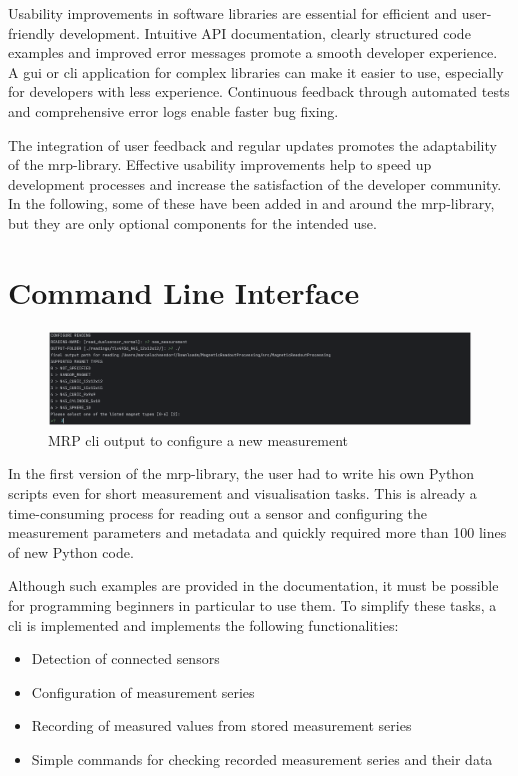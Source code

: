 Usability improvements in software libraries are essential for efficient
and user-friendly development. Intuitive API documentation, clearly
structured code examples and improved error messages promote a smooth
developer experience. A \gls{gui} or \gls{cli} application for complex
libraries can make it easier to use, especially for developers with less
experience. Continuous feedback through automated tests and
comprehensive error logs enable faster bug fixing.

The integration of user feedback and regular updates promotes the
adaptability of the \gls{mrp}-library. Effective usability improvements
help to speed up development processes and increase the satisfaction of
the developer community. In the following, some of these have been added
in and around the \gls{mrp}-library, but they are only optional
components for the intended use.

\hypertarget{command-line-interface}{%
\section{Command Line Interface}\label{command-line-interface}}

\begin{figure}
\centering
\includegraphics{./generated_images/border_MRP_(+cli)_output_to_configure_a_new_measurement.png}
\caption{MRP \gls{cli} output to configure a new measurement
\label{MRP_(+cli)_output_to_configure_a_new_measurement.png}}
\end{figure}

In the first version of the \gls{mrp}-library, the user had to write his
own Python scripts even for short measurement and visualisation tasks.
This is already a time-consuming process for reading out a sensor and
configuring the measurement parameters and metadata and quickly required
more than 100 lines of new Python code.

Although such examples are provided in the documentation, it must be
possible for programming beginners in particular to use them. To
simplify these tasks, a \gls{cli} is implemented and implements the
following functionalities:

\begin{itemize}
\tightlist
\item
  Detection of connected sensors
\item
  Configuration of measurement series
\item
  Recording of measured values from stored measurement series
\item
  Simple commands for checking recorded measurement series and their
  data
\end{itemize}

